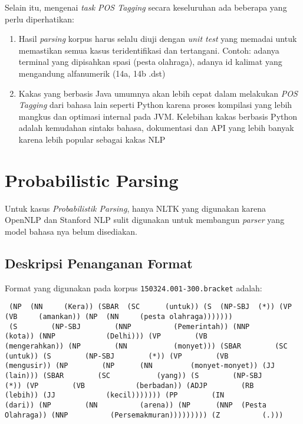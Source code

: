 \documentclass[paper=a4, fontsize=11pt]{scrartcl} %
\numberwithin{equation}{section} %
\numberwithin{figure}{section} %
\numberwithin{table}{section} %
\begin{document}
Selain itu, mengenai \textit{task POS Tagging} secara keseluruhan ada beberapa yang perlu diperhatikan:

\begin{enumerate}
	\item Hasil \textit{parsing} korpus harus selalu diuji dengan \textit{unit test} yang memadai untuk memastikan semua kasus teridentifikasi dan tertangani. Contoh: adanya terminal yang dipisahkan spasi (pesta olahraga), adanya id kalimat yang mengandung alfanumerik (14a, 14b .dst)
	\item Kakas yang berbasis Java umumnya akan lebih cepat dalam melakukan \textit{POS Tagging} dari bahasa lain seperti Python karena proses kompilasi yang lebih mangkus dan optimasi internal pada JVM. Kelebihan kakas berbasis Python adalah kemudahan sintaks bahasa, dokumentasi dan API yang lebih banyak karena lebih popular sebagai kakas NLP
\end{enumerate}

\pagebreak


\section{Probabilistic Parsing}


Untuk kasus \textit{Probabilistik Parsing}, hanya NLTK yang digunakan karena OpenNLP dan Stanford NLP sulit digunakan untuk membangun \textit{parser} yang model bahasa nya belum disediakan.

\subsection{Deskripsi Penanganan Format}

Format yang digunakan pada korpus \verb|150324.001-300.bracket| adalah:

\begin{lstlisting}
 (NP  (NN	  (Kera)) (SBAR  (SC	  (untuk)) (S  (NP-SBJ  (*)) (VP  (VB	  (amankan)) (NP  (NN	  (pesta olahraga)))))))
 (S        (NP-SBJ        (NNP	        (Pemerintah)) (NNP	        (kota)) (NNP	        (Delhi))) (VP        (VB	        (mengerahkan)) (NP        (NN	        (monyet))) (SBAR        (SC	        (untuk)) (S        (NP-SBJ        (*)) (VP        (VB	        (mengusir)) (NP        (NP      (NN	        (monyet-monyet)) (JJ	        (lain))) (SBAR        (SC	        (yang)) (S        (NP-SBJ        (*)) (VP        (VB	        (berbadan)) (ADJP        (RB	        (lebih)) (JJ	        (kecil))))))) (PP        (IN	        (dari)) (NP        (NN	        (arena)) (NP      (NNP  (Pesta Olahraga)) (NNP	        (Persemakmuran))))))))) (Z	        (.)))
\end{lstlisting}
\end{document}
